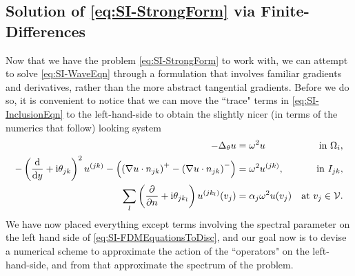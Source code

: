 \subsection{Solution of \eqref{eq:SI-StrongForm} via Finite-Differences} \label{ssec:SI-FDMMethod}
Now that we have the problem \eqref{eq:SI-StrongForm} to work with, we can attempt to solve \eqref{eq:SI-WaveEqn} through a formulation that involves familiar gradients and derivatives, rather than the more abstract tangential gradients.
Before we do so, it is convenient to notice that we can move the ``trace" terms in \eqref{eq:SI-InclusionEqn} to the left-hand-side to obtain the slightly nicer (in terms of the numerics that follow) looking system
\begin{subequations} \label{eq:SI-FDMEquationsToDisc}
	\begin{align}
		-\Delta_\theta u 
		&= \omega^2 u 
		&\text{in } \Omega_i, \label{eq:SI-FDMBulk} \\
		- \left( \dfrac{\mathrm{d}}{\mathrm{d}y} + \mathrm{i}\theta_{jk} \right)^2u^{(jk)}  - \left( \left( \nabla u\cdot n_{jk} \right)^+ - \left( \nabla u\cdot n_{jk} \right)^- \right)
		&= \omega^2 u^{(jk)},
		&\text{in } I_{jk}, \label{eq:SI-FDMSkeleton} \\
		\sum_l \left( \dfrac{\partial }{\partial n}+\mathrm{i}\theta_{jk_l} \right) u^{(jk_l)}(v_j) 
		&= \alpha_j\omega^2 u(v_j)
		&\text{at } v_j\in\mathcal{V}. \label{eq:SI-FDMVertex}
	\end{align}
\end{subequations}
We have now placed everything except terms involving the spectral parameter on the left hand side of \eqref{eq:SI-FDMEquationsToDisc}, and our goal now is to devise a numerical scheme to approximate the action of the ``operators" on the left-hand-side, and from that approximate the spectrum of the problem.

